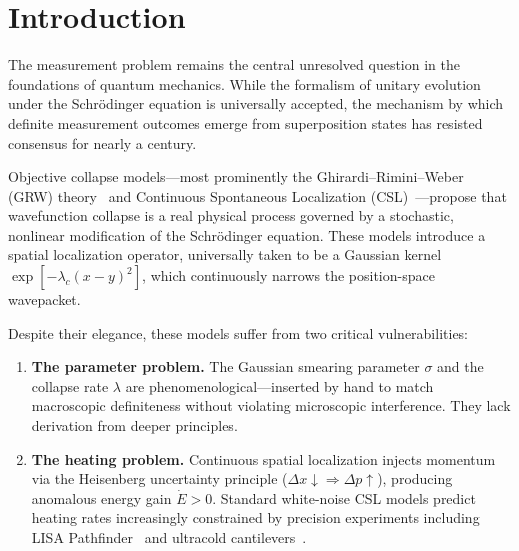 \documentclass[aps,prd,twocolumn,superscriptaddress,nofootinbib]{revtex4-2}
\theoremstyle{definition}
\theoremstyle{remark}
\begin{document}
\maketitle


\section{Introduction}
\label{sec:introduction}

The measurement problem remains the central unresolved question in the
foundations of quantum mechanics. While the formalism of unitary evolution
under the Schr\"odinger equation is universally accepted, the mechanism by
which definite measurement outcomes emerge from superposition states has
resisted consensus for nearly a century.

Objective collapse models---most prominently the Ghirardi--Rimini--Weber
(GRW) theory~\cite{GRW1986} and Continuous Spontaneous Localization
(CSL)~\cite{Pearle1989,GhirardiPearleRimini1990}---propose that
wavefunction collapse is a real physical process governed by a stochastic,
nonlinear modification of the Schr\"odinger equation. These models
introduce a spatial localization operator, universally taken to be a
Gaussian kernel $\exp[-\lambda_c(x-y)^2]$, which continuously narrows the
position-space wavepacket.

Despite their elegance, these models suffer from two critical
vulnerabilities:

\begin{enumerate}
\item \textbf{The parameter problem.} The Gaussian smearing parameter
$\sigma$ and the collapse rate $\lambda$ are phenomenological---inserted by
hand to match macroscopic definiteness without violating microscopic
interference. They lack derivation from deeper principles.

\item \textbf{The heating problem.} Continuous spatial localization injects
momentum via the Heisenberg uncertainty principle ($\Delta x \downarrow
\Rightarrow \Delta p \uparrow$), producing anomalous energy gain
$\dot{E} > 0$. Standard white-noise CSL models predict heating rates
increasingly constrained by precision experiments including LISA
Pathfinder~\cite{LISAPathfinder2016} and ultracold
cantilevers~\cite{Vinante2017}.
\end{enumerate}
\end{document}
